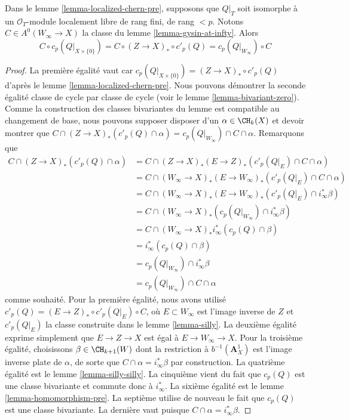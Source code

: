 \begin{lemma}
\label{lemma-homomorphism}
Dans le lemme \ref{lemma-localized-chern-pre}, supposons que $Q|_T$ soit isomorphe
à un $\mathcal{O}_T$-module localement libre de rang fini, de rang $< p$.
Notons $C \in A^0(W_\infty \to X)$ la classe du
lemme \ref{lemma-gysin-at-infty}. Alors
$$
C \circ c_p(Q|_{X \times \{0\}}) =
C \circ (Z \to X)_* \circ c'_p(Q) = c_p(Q|_{W_\infty}) \circ C
$$
\end{lemma}

\begin{proof}
La première égalité vaut car $c_p(Q|_{X \times \{0\}}) =
(Z \to X)_* \circ c'_p(Q)$ d'après le lemme \ref{lemma-localized-chern-pre}.
Nous pouvons démontrer la seconde égalité classe de cycle par classe de cycle
(voir le lemme \ref{lemma-bivariant-zero}). Comme la construction des
classes bivariantes du lemme est compatible au changement de base,
nous pouvons supposer disposer d'un $\alpha \in \CH_k(X)$ et devoir montrer que
$C \cap (Z \to X)_*(c'_p(Q) \cap \alpha) =
c_p(Q|_{W_\infty}) \cap C \cap \alpha$. Remarquons que
\begin{align*}
C \cap (Z \to X)_*(c'_p(Q) \cap \alpha)
& =
C \cap (Z \to X)_* (E \to Z)_*(c'_p(Q|_E) \cap C \cap \alpha) \\
& =
C \cap (W_\infty \to X)_*(E \to W_\infty)_*(c'_p(Q|_E) \cap C \cap \alpha) \\
& =
C \cap (W_\infty \to X)_*(E \to W_\infty)_*(c'_p(Q|_E) \cap i_\infty^*\beta) \\
& =
C \cap (W_\infty \to X)_*(c_p(Q|_{W_\infty}) \cap i_\infty^*\beta) \\
& =
C \cap (W_\infty \to X)_*i_\infty^*(c_p(Q) \cap \beta) \\
& =
i_\infty^*(c_p(Q) \cap \beta) \\
& =
c_p(Q|_{W_\infty}) \cap i_\infty^*\beta \\
& =
c_p(Q|_{W_\infty}) \cap C \cap \alpha
\end{align*}
comme souhaité. Pour la première égalité, nous avons utilisé
$c'_p(Q) = (E \to Z)_* \circ c'_p(Q|_E) \circ C$, où $E \subset W_\infty$
est l'image inverse de $Z$ et $c'_p(Q|_E)$ la classe construite
dans le lemme \ref{lemma-silly}. La deuxième égalité exprime simplement
que $E \to Z \to X$ est égal à $E \to W_\infty \to X$.
Pour la troisième égalité, choisissons $\beta \in \CH_{k + 1}(W)$ dont la restriction à
$b^{-1}(\mathbf{A}^1_X)$ est l'image inverse plate de $\alpha$, de sorte que
$C \cap \alpha = i_\infty^*\beta$ par construction. La quatrième égalité est le
lemme \ref{lemma-silly-silly}. La cinquième vient du fait que
$c_p(Q)$ est une classe bivariante et commute donc à $i_\infty^*$.
La sixième égalité est le lemme \ref{lemma-homomorphism-pre}.
La septième utilise de nouveau le fait que $c_p(Q)$ est une classe bivariante.
La dernière vaut puisque $C \cap \alpha = i_\infty^*\beta$.
\end{proof}

